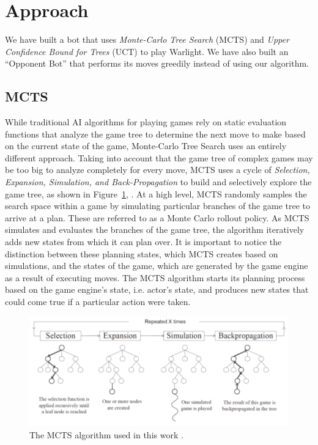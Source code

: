 \documentclass[a4paper,11pt]{article}
\begin{document}
\section{Approach}\label{sec:approach}
We have built a bot that uses \emph{Monte-Carlo Tree Search} (MCTS) and \emph{Upper 
Confidence Bound for Trees} (UCT) to play Warlight.  We have also built an ``Opponent Bot'' 
that performs its moves greedily instead of using our algorithm.

\subsection{MCTS}
While traditional AI algorithms for playing games rely on static evaluation functions that 
analyze the game tree to determine the next move to make based on the current state of the 
game, Monte-Carlo Tree Search uses an entirely different approach.  Taking into account that 
the game tree of complex games may be too big to analyze completely for every move, MCTS 
uses a cycle of \emph{Selection, Expansion, Simulation, and Back-Propagation} to build and selectively 
explore the game tree, as shown in Figure~\ref{fig:mcts_alg}, \cite{mcts}.  At a high level, MCTS randomly 
samples the search space within a game by simulating particular branches of the game tree to arrive at 
a plan.  These are referred to as a Monte Carlo rollout policy. As MCTS simulates and evaluates the 
branches of the game tree, the algorithm iteratively adds new states from which it can plan over.  
It is important to notice the distinction between these planning states, which MCTS creates based on 
simulations, and the states of the game, which are generated by the game engine as a result of executing 
moves.  The MCTS algorithm starts its planning process based on the game engine's state, i.e. actor's 
state, and produces new states that could come true if a particular action were taken.

%
\begin{figure}[!htbp]
  \centering
  \includegraphics[width=0.7\columnwidth]{mcts_algorithm}
  \caption{The MCTS algorithm used in this work \cite{mcts}.}
  \label{fig:mcts_alg}
\end{figure}
%
\end{document}
